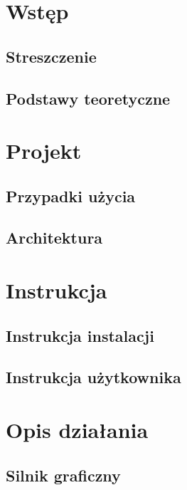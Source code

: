 \documentclass[a4paper,titlepage,10pt]{report}
\begin{document}
	
	\newpage

	\tableofcontents
	\newpage

	\chapter{Wstęp}\label{chap:wstęp}
	\section{Streszczenie}\label{sec:streszczenie}
	
	\newpage
	\section{Podstawy teoretyczne}\label{sec:podstawy teoretyczne}
	

	\chapter{Projekt}\label{chap:projekt}
	\section{Przypadki użycia}\label{sec:przypadki użycia}
	
	\section{Architektura}\label{sec:architektura}
	

	\chapter{Instrukcja}\label{chap:instrukcja}
	\section{Instrukcja instalacji}\label{sec:instrukcja użytkownika}
	
	\section{Instrukcja użytkownika}\label{sec:instrukcja użytkownika}
	

	\chapter{Opis działania}\label{chap:opis dzialania}
	\section{Silnik graficzny}\label{sec:silnik graficzny}
	
\end{document}
